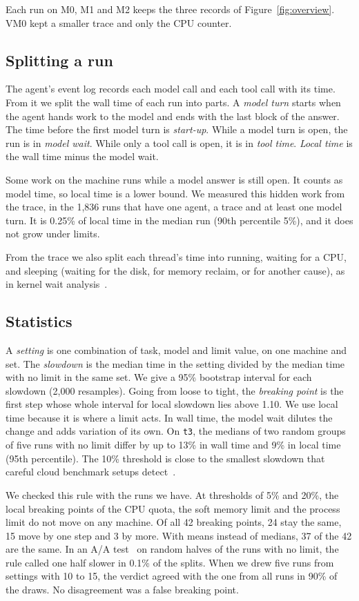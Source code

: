 \documentclass[sigconf,review,anonymous]{acmart}
\begin{document}
Each run on M0, M1 and M2 keeps the three records of
Figure~\ref{fig:overview}. VM0 kept a smaller trace and only the CPU
counter.

\subsection{Splitting a run}
The agent's event log records each model call and each tool call with
its time. From it we split the wall time of each run into parts. A
\emph{model turn} starts when the agent hands work to the model and ends
with the last block of the answer. The time before the first model turn
is \emph{start-up}. While a model turn is open, the run is in
\emph{model wait}. While only a tool call is open, it is in \emph{tool
time}. \emph{Local time} is the wall time minus the model wait.

Some work on the machine runs while a model answer is still open. It
counts as model time, so local time is a lower bound. We measured this
hidden work from the trace, in the 1,836 runs that have one agent, a
trace and at least one model turn. It is 0.25\% of local time in the
median run (90th percentile 5\%), and it does not grow under limits.

From the trace we also split each thread's time into running, waiting
for a CPU, and sleeping (waiting for the disk, for memory reclaim, or
for another cause), as in kernel wait
analysis~\cite{giraldeau2016,ezzati2020}.

\subsection{Statistics}
A \emph{setting} is one combination of task, model and limit value, on
one machine and set. The \emph{slowdown} is the median time in the
setting divided by the median time with no limit in the same set.
 We give a 95\% bootstrap interval
for each slowdown (2,000 resamples). Going from loose to tight, the
\emph{breaking point} is the first step whose whole interval for local
slowdown lies above 1.10. We use local time because it is where a limit acts.
In wall time, the model wait dilutes the change and adds variation of
its own. On \texttt{t3}, the medians of two random groups of five runs
with no limit differ by up to 13\% in wall time and 9\% in local time
(95th percentile). The 10\% threshold is close to the smallest slowdown that
careful cloud benchmark setups detect~\cite{laaber2019}.

We checked this rule with the runs we have. At thresholds of 5\% and
20\%, the local breaking points of the CPU quota, the soft memory limit
and the process limit do not move on any machine. Of all 42 breaking
points, 24 stay the same, 15 move by one step and 3 by more. With means
instead of medians, 37 of the 42 are the same. In an A/A
test~\cite{laaber2019} on random halves of the runs with no limit, the
rule called one half slower in 0.1\% of the splits. When we drew five
runs from settings with 10 to 15, the verdict agreed with the one from
all runs in 90\% of the draws. No disagreement was a false breaking point.
\end{document}
